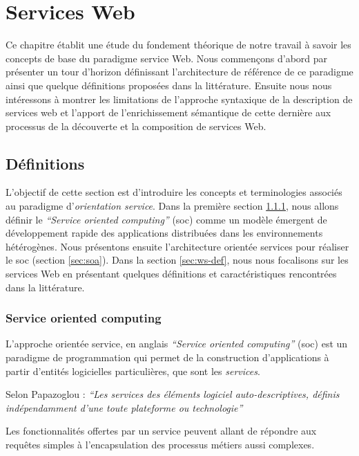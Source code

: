 \chapter{Services Web}
\label{ch:web-service}

Ce chapitre établit une étude du fondement théorique de notre travail
à savoir les concepts de base du paradigme service Web.  Nous
commençons d'abord par présenter un tour d'horizon définissant
l'architecture de référence de ce paradigme ainsi que quelque
définitions proposées dans la littérature. Ensuite nous nous
intéressons à montrer les limitations de l'approche syntaxique de la
description de services web et l'apport de l'enrichissement sémantique
de cette dernière aux processus de la découverte et la composition de
services Web.

\newpage
\section{Définitions}
\label{sec:ws-definitions}
L'objectif de cette section est d'introduire les concepts et
terminologies associés au paradigme d'\textit{orientation
  service}. Dans la première section \ref{sec:soc}, nous allons
définir le \textit{``Service oriented computing''} (\acrshort{soc})
comme un modèle émergent de développement rapide des applications
distribuées dans les environnements hétérogènes. Nous présentons
ensuite l'architecture orientée services pour réaliser le
\acrshort{soc} (section \ref{sec:soa}). Dans la section
\ref{sec:ws-def}, nous nous focalisons sur les services Web en
présentant quelques définitions et caractéristiques rencontrées dans
la littérature.

\subsection{Service oriented computing}
  \label{sec:soc}
  L'approche orientée service, en anglais \textit{``Service oriented
    computing''} (\acrshort{soc}) est un paradigme de programmation
  qui permet de la construction d'applications à partir d'entités
  logicielles particulières, que sont les \emph{services}.\bigskip

  Selon Papazoglou \cite{papazoglou2003service}: \textit{``Les
    services des éléments logiciel auto-descriptives, définis
    indépendamment d'une toute plateforme ou technologie''}\bigskip

  Les fonctionnalités offertes par un service peuvent allant de
  répondre aux requêtes simples à l'encapsulation des processus
  métiers aussi complexes.\medskip

